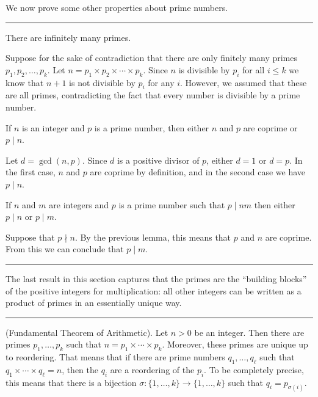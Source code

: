 \documentclass[letterpaper,10pt,english]{sphinxmanual}
\begin{document}
\sphinxAtStartPar
We now prove some other properties about prime numbers.


\bigskip\hrule\bigskip


\sphinxAtStartPar
{} There are infinitely many primes.

\sphinxAtStartPar
{} Suppose for the sake of contradiction that there are only finitely many primes \(p_1, p_2, \ldots, p_k\). Let \(n = p_1 \times p_2 \times \cdots \times p_k\). Since \(n\) is divisible by \(p_i\) for all \(i\leq k\) we know that \(n+1\) is not divisible by \(p_i\) for any \(i\). However, we assumed that these are all primes, contradicting the fact that every number is divisible by a prime number.

\sphinxAtStartPar
{} If \(n\) is an integer and \(p\) is a prime number, then either \(n\) and \(p\) are coprime or \(p \mid n\).

\sphinxAtStartPar
{} Let \(d = \gcd(n, p)\). Since \(d\) is a positive divisor of \(p\), either \(d = 1\) or \(d = p\). In the first case, \(n\) and \(p\) are coprime by definition, and in the second case we have \(p \mid n\).

\sphinxAtStartPar
{} If \(n\) and \(m\) are integers and \(p\) is a prime number such that \(p \mid nm\) then either \(p \mid n\) or \(p \mid m\).

\sphinxAtStartPar
{} Suppose that \(p \nmid n\). By the previous lemma, this means that \(p\) and \(n\) are coprime. From this we can conclude that \(p \mid m\).


\bigskip\hrule\bigskip


\sphinxAtStartPar
The last result in this section captures that the primes are the “building blocks” of the positive integers for multiplication: all other integers can be written as a product of primes in an essentially unique way.


\bigskip\hrule\bigskip


\sphinxAtStartPar
{} (Fundamental Theorem of Arithmetic). Let \(n > 0\) be an integer. Then there are primes \(p_1, \ldots, p_k\) such that \(n = p_1\times \cdots \times p_k\). Moreover, these primes are unique up to reordering. That means that if there are prime numbers \(q_1, \ldots, q_\ell\) such that \(q_1\times \cdots \times q_\ell = n\), then the \(q_i\) are a reordering of the \(p_i\). To be completely precise, this means that there is a bijection \(\sigma : \{1, \ldots, k\} \to \{1, \ldots, k\}\) such that \(q_i = p_{\sigma(i)}\).
\end{document}
